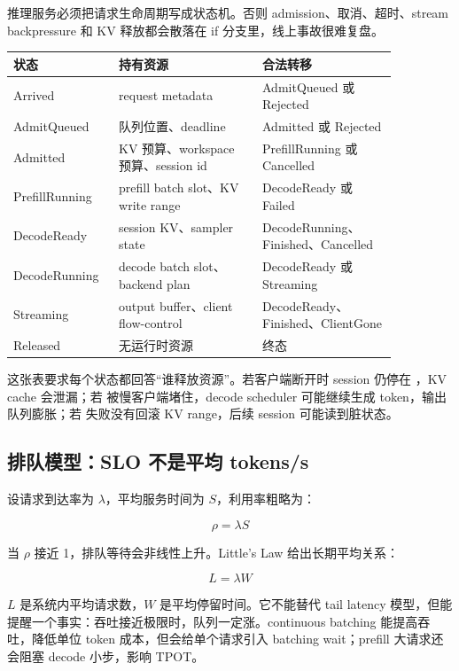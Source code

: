 推理服务必须把请求生命周期写成状态机。否则 admission、取消、超时、stream backpressure 和 KV 释放都会散落在 if 分支里，线上事故很难复盘。

\begin{center}
\begin{tabular}{p{0.20\linewidth}p{0.34\linewidth}p{0.32\linewidth}}
\toprule
状态 & 持有资源 & 合法转移 \\
\midrule
Arrived & request metadata & AdmitQueued 或 Rejected \\
AdmitQueued & 队列位置、deadline & Admitted 或 Rejected \\
Admitted & KV 预算、workspace 预算、session id & PrefillRunning 或 Cancelled \\
PrefillRunning & prefill batch slot、KV write range & DecodeReady 或 Failed \\
DecodeReady & session KV、sampler state & DecodeRunning、Finished、Cancelled \\
DecodeRunning & decode batch slot、backend plan & DecodeReady 或 Streaming \\
Streaming & output buffer、client flow-control & DecodeReady、Finished、ClientGone \\
Released & 无运行时资源 & 终态 \\
\bottomrule
\end{tabular}
\end{center}

这张表要求每个状态都回答“谁释放资源”。若客户端断开时 session 仍停在 ，KV cache 会泄漏；若  被慢客户端堵住，decode scheduler 可能继续生成 token，输出队列膨胀；若  失败没有回滚 KV range，后续 session 可能读到脏状态。

\subsection{排队模型：SLO 不是平均 tokens/s}

设请求到达率为 \(\lambda\)，平均服务时间为 \(S\)，利用率粗略为：

\[
\rho = \lambda S
\]

当 \(\rho\) 接近 1，排队等待会非线性上升。Little's Law 给出长期平均关系：

\[
L = \lambda W
\]

\(L\) 是系统内平均请求数，\(W\) 是平均停留时间。它不能替代 tail latency 模型，但能提醒一个事实：吞吐接近极限时，队列一定涨。continuous batching 能提高吞吐，降低单位 token 成本，但会给单个请求引入 batching wait；prefill 大请求还会阻塞 decode 小步，影响 TPOT。

